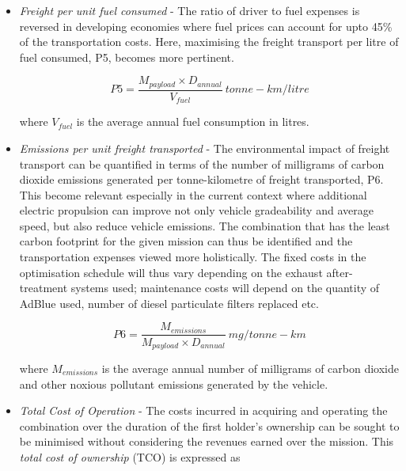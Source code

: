 \documentclass[ExampleMasters.tex]{subfiles}
\begin{document}
\begin{itemize}
			\item \textit{Freight per unit fuel consumed} - The ratio of driver to fuel expenses is reversed in developing economies where fuel prices can account for upto 45\% of the transportation costs. Here, maximising the freight transport per litre of fuel consumed, P5, becomes more pertinent.
			
			\begin{equation}
				P5 = \frac{M_{payload} \times D_{annual}}{V_{fuel}} \ tonne-km/litre
			\end{equation}

			where $V_{fuel}$  is the average annual fuel consumption in litres.\\

			\item \textit{Emissions per unit freight transported} - The environmental impact of freight transport can be quantified in terms of the number of milligrams of carbon dioxide emissions generated per tonne-kilometre of freight transported, P6. This become relevant especially in the current context where additional electric propulsion can improve not only vehicle gradeability and average speed, but also reduce vehicle emissions. The combination that has the least carbon footprint for the given mission can thus be identified and the transportation expenses viewed more holistically. The fixed costs in the optimisation schedule will thus vary depending on the exhaust after-treatment systems used; maintenance costs will depend on the quantity of AdBlue used, number of diesel particulate filters replaced etc.

			\begin{equation}
				P6 = \frac{M_{emissions}}{M_{payload} \times D_{annual}}\  mg/tonne-km
			\end{equation}

			where $M_{emissions}$  is the average annual number of milligrams of carbon dioxide and other noxious pollutant emissions generated by the vehicle.

			\item \textit{Total Cost of Operation} - The costs incurred in acquiring and operating the combination over the duration of the first holder's ownership can be sought to be minimised without considering the revenues earned over the mission. This \textit{total cost of ownership} (TCO) is expressed as


\end{itemize}
\end{document}
